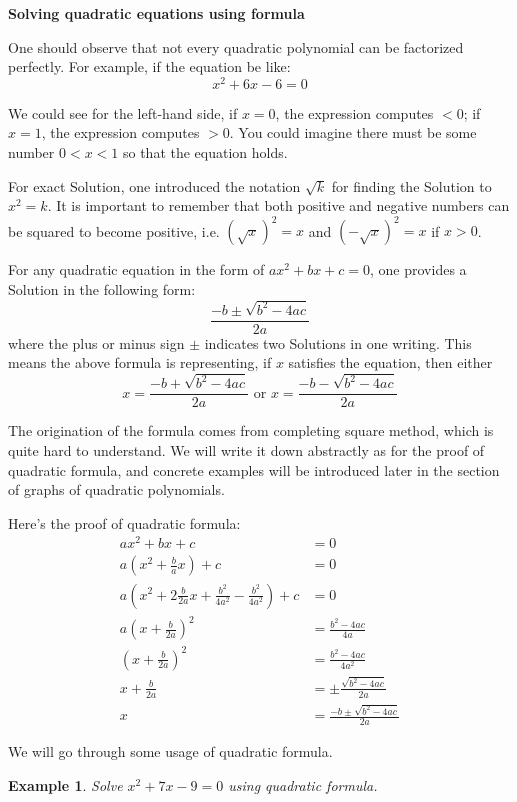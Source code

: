 \documentclass[12pt]{article}
\newtheorem{example}{Example}
\begin{document}
    \begin{center}
        \textbf{Solving quadratic equations using formula}
    \end{center}

    One should observe that not every quadratic polynomial can be factorized perfectly. For example, if the equation be like:$$x^2+6x-6=0$$

    We could see for the left-hand side, if $x=0$, the expression computes $<0$; if $x=1$, the expression computes $>0$. You could imagine there must be some number $0<x<1$ so that the equation holds.
    
    For exact Solution, one introduced the notation $\sqrt{k}$ for finding the Solution to $x^2=k$. It is important to remember that both positive and negative numbers can be squared to become positive, i.e. $(\sqrt{x})^2=x$ and $(-\sqrt{x})^2=x$ if $x>0$.

    For any quadratic equation in the form of $ax^2+bx+c=0$, one provides a Solution in the following form:$$\frac{-b\pm\sqrt{b^2-4ac}}{2a}$$where the plus or minus sign $\pm$ indicates two Solutions in one writing. This means the above formula is representing, if $x$ satisfies the equation, then either $$x=\frac{-b+\sqrt{b^2-4ac}}{2a}\textrm{ or }x=\frac{-b-\sqrt{b^2-4ac}}{2a}$$ 
    
    The origination of the formula comes from completing square method, which is quite hard to understand. We will write it down abstractly as for the proof of quadratic formula, and concrete examples will be introduced later in the section of graphs of quadratic polynomials.

    Here's the proof of quadratic formula:\begin{align*}
        ax^2+bx+c&=0\\
        a(x^2+\frac{b}{a}x)+c&=0\\
        a(x^2+2\frac{b}{2a}x+\frac{b^2}{4a^2}-\frac{b^2}{4a^2})+c&=0\\
        a(x+\frac{b}{2a})^2&=\frac{b^2-4ac}{4a}\\
        (x+\frac{b}{2a})^2&=\frac{b^2-4ac}{4a^2}\\
        x+\frac{b}{2a}&=\pm\frac{\sqrt{b^2-4ac}}{2a}\\
        x&=\frac{-b\pm\sqrt{b^2-4ac}}{2a}
    \end{align*}

    We will go through some usage of quadratic formula.

    \begin{example}
        Solve $x^2+7x-9=0$ using quadratic formula.
    \end{example}
\end{document}

